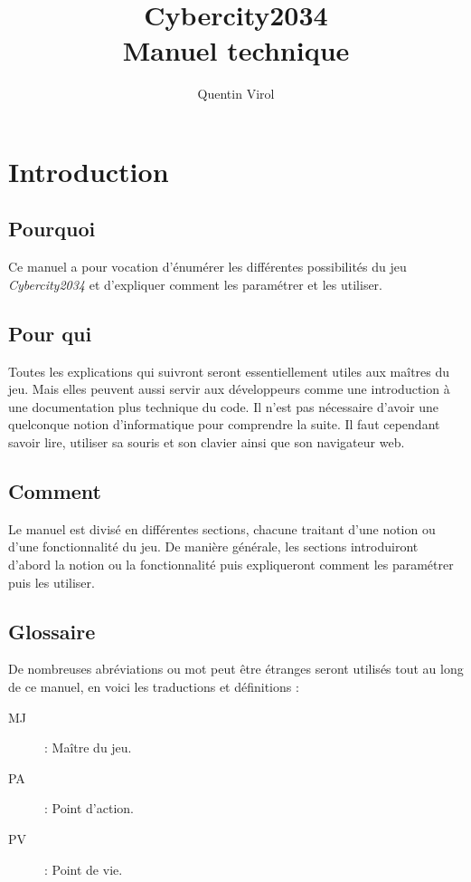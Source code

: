 \documentclass{article}
\begin{document}
\title{Cybercity2034\\Manuel technique}
\author{Quentin Virol}

\maketitle

\newpage

\tableofcontents

\newpage

\section{Introduction}

\subsection*{Pourquoi}

Ce manuel a pour vocation d'énumérer les différentes possibilités du jeu \emph{Cybercity2034} et d'expliquer comment les paramétrer et les utiliser. 

\subsection*{Pour qui}

Toutes les explications qui suivront seront essentiellement utiles aux maîtres du jeu. Mais elles peuvent aussi servir aux développeurs comme une introduction à une documentation plus technique du code. Il n'est pas nécessaire d'avoir une quelconque notion d'informatique pour comprendre la suite. Il faut cependant savoir lire, utiliser sa souris et son clavier ainsi que son navigateur web.

\subsection*{Comment}

Le manuel est divisé en différentes sections, chacune traitant d'une notion ou d'une fonctionnalité du jeu. De manière générale, les sections introduiront d'abord la notion ou la fonctionnalité puis expliqueront comment les paramétrer puis les utiliser.

\subsection*{Glossaire}

De nombreuses abréviations ou mot peut être étranges seront utilisés tout au long de ce manuel, en voici les traductions et définitions :

\begin{description}
	\item[MJ] : Maître du jeu.
	\item[PA] : Point d'action.
	\item[PV] : Point de vie.
\end{description}


\end{document}
